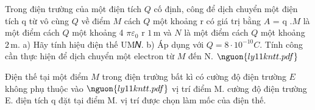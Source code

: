 \begin{ex}
Trong điện trường của một điện tích $Q$ cố định, công để dịch chuyển một điện tích q từ vô cùng $Q$ về điểm $M$ cách $Q$ một khoảng r có giá trị bằng $A$ \inftyM = q $.M$ là một điểm cách $Q$ một khoảng 4 $\pi\varepsilon_0$ r $1\,\text{m}$ và $N$ là một điểm cách $Q$ một khoảng $2\,\text{m}$. a) Hãy tính hiệu điện thế UM𝑁. b) Áp dụng với $Q = 8 \cdot 10^{-10} C$. Tính công cần thực hiện để dịch chuyển một electron từ $M$ đến N. $\nguon{ly11 kntt.pdf}$
\choiceTF

\end{ex}

\begin{ex}
Điện thế tại một điểm $M$ trong điện trường bất kì có cường độ điện trường $E$ không phụ thuộc vào $\nguon{ly11 kntt.pdf}$
\choice
{vị trí điểm M.}
{cường độ điện trường E.}
{\True điện tích q đặt tại điểm M.}
{vị trí được chọn làm mốc của điện thế.}
\end{ex}

